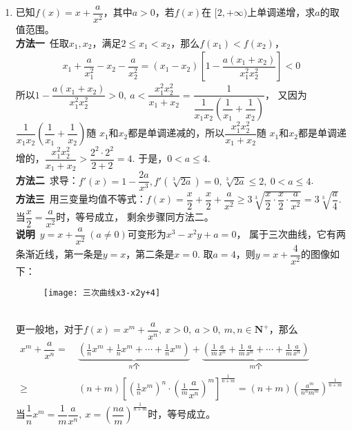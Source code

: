 \begin{enumerate}[label={【\textbf{例\thechapter.\arabic*}】},
 leftmargin=\inteval{\myenumleftmargin}pt,
 itemsep=\inteval{\myenumitempsep}pt,
 itemindent=\inteval{\myenumitemindent}pt]
\item 已知$ f(x)=x+\dfrac{a}{x^2} $，其中$ a>0 $，若$ f(x) $在
$ [2,+\infty) $上单调递增，求$ a $的取值范围。 \\
\textbf{方法一}\ 任取$ x_1,x_2 $，满足$ 2\leq x_1<x_2 $，那么$ f(x_1)<f(x_2) $，
\begin{align*}
    x_1+\dfrac{a}{x_1^2}-x_2-\dfrac{a}{x_2^2} 
    =(x_1-x_2)\left[1-\dfrac{a(x_1+x_2)}{x_1^2x_2^2} \right] <0 
\end{align*} 
所以$ 1-\dfrac{a(x_1+x_2)}{x_1^2x_2^2}>0,\ a<\dfrac{x_1^2x_2^2}{x_1+x_2}=
\dfrac{1}{\dfrac{1}{x_1x_2}\left(\dfrac{1}{x_1}+\dfrac{1}{x_2}\right)} $，
又因为$ \dfrac{1}{x_1x_2}\left(\dfrac{1}{x_1}+\dfrac{1}{x_2}\right) $随
$ x_1 $和$ x_2 $都是单调递减的，所以$ \dfrac{x_1^2x_2^2}{x_1+x_2} $随
$ x_1 $和$ x_2 $都是单调递增的，$ \dfrac{x_1^2x_2^2}{x_1+x_2}>
\dfrac{2^2\cdot 2^2}{2+2}=4 $. 于是，$ 0<a\leq 4 $. \\
\textbf{方法二}\ 求导：$ f'(x)=1-\dfrac{2a}{x^3},f'\left(\sqrt[3]{
    2a} \right)=0,\sqrt[3]{2a}\leq 2,\ 0<a\leq 4 $. \smallskip \\
\textbf{方法三}\ 用三变量均值不等式：$ f(x)=\dfrac{x}{2}+\dfrac{x}{2}+\dfrac{a}{x^2}
\geq 3\sqrt[3]{\dfrac{x}{2}\cdot\dfrac{x}{2}\cdot \dfrac{a}{x^2}}=
3\sqrt[3]{\dfrac{a}{4}} $. 当$ \dfrac{x}{2}=\dfrac{a}{x^2} $时，等号成立，
剩余步骤同方法二。 \\
\textbf{说明}\ $ y=x+\dfrac{a}{x^2}\ (a\neq 0) $可变形为$ x^3-x^2y+a=0 $，
属于三次曲线，它有两条渐近线，第一条是$ y=x $，第二条是$ x=0 $. 
取$ a=4 $，则$ y=x+\dfrac{4}{x^2} $的图像如下：
\begin{figure}[h]
    \centering
    \texttt{[image: 三次曲线x3-x2y+4]}
\end{figure} \\
更一般地，对于$ f(x)=x^m+\dfrac{a}{x^n},\ x>0,\ a>0,\ m,n\in \textbf{N}^+ $，那么
\begin{align*}
    x^m+\dfrac{a}{x^n}=&\ \underbrace{\left(\frac{1}{n}x^m+\frac{1}{n}x^m+\cdots+
        \frac{1}{n}x^m \right)}_{n\text{个}}+
    \underbrace{\left(\frac{1}{m}\frac{a}{x^n}+\frac{1}{m}\frac{a}{x^n}
     +\cdots+ \frac{1}{m}\frac{a}{x^n} \right)}_{m\text{个}}  \\
    \geq &\ (n+m) \left[\left(\frac{1}{n}x^m\right)^n\cdot 
    \left(\frac{1}{m}\dfrac{a}{x^n}\right)^m\right]^{\frac{1}{n+m}} 
    =(n+m) \left(\frac{a^m}{n^nm^m}\right)^{\frac{1}{n+m}}
\end{align*}
当$ \dfrac{1}{n}x^m=\dfrac{1}{m}\dfrac{a}{x^n},\ 
x=\left(\dfrac{na}{m}\right)^{\frac{1}{n+m}} $时，等号成立。\\


\end{enumerate}
